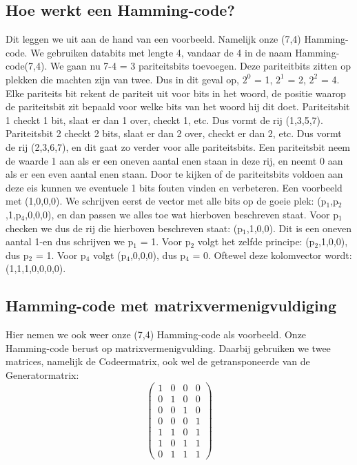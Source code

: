 \documentclass[a4paper]{article}
\begin{document}
\subsection{Hoe werkt een Hamming-code?}
Dit leggen we uit aan de hand van een voorbeeld. Namelijk onze (7,4) Hamming-code.
We gebruiken databits met lengte 4, vandaar de 4 in de naam Hamming-code(7,4). We gaan nu 7-4 = 3 pariteitsbits toevoegen. Deze pariteitbits zitten op plekken die machten zijn van twee. Dus in dit geval op, $2^0$ = 1, $2^1$ = 2, $2^2$ = 4. Elke pariteits bit rekent de pariteit uit voor bits in het woord, de positie waarop de pariteitsbit zit bepaald voor welke bits van het woord hij dit doet. Pariteitsbit 1 checkt 1 bit, slaat er dan 1 over, checkt 1, etc. Dus vormt de rij (1,3,5,7). Pariteitsbit 2 checkt 2 bits, slaat er dan 2 over, checkt er dan 2, etc. Dus vormt de rij (2,3,6,7), en dit gaat zo verder voor alle pariteitsbits. Een pariteitsbit neem de waarde 1 aan als er een oneven aantal enen staan in deze rij, en neemt 0 aan als er een even aantal enen staan. Door te kijken of de pariteitsbits voldoen aan deze eis kunnen we eventuele 1 bits fouten vinden en verbeteren. Een voorbeeld met (1,0,0,0). We schrijven eerst de vector met alle bits op de goeie plek: (p$_1$,p$_2$,1,p$_4$,0,0,0), en dan passen we alles toe wat hierboven beschreven staat. Voor p$_1$ checken we dus de rij die hierboven beschreven staat: (p$_1$,1,0,0). Dit is een oneven aantal 1-en dus schrijven we p$_1$ = 1. Voor p$_2$ volgt het zelfde principe: (p$_2$,1,0,0), dus p$_2$ = 1. Voor p$_4$ volgt (p$_4$,0,0,0), dus p$_4$ = 0. Oftewel deze kolomvector wordt: (1,1,1,0,0,0,0).

\subsection{Hamming-code met matrixvermenigvuldiging}
Hier nemen we ook weer onze (7,4) Hamming-code als voorbeeld. Onze Hamming-code berust op matrixvermenigvulding. Daarbij gebruiken we twee matrices, namelijk de Codeermatrix, ook wel de getransponeerde van de \\
Generatormatrix:
\begin{equation*}
	\begin{pmatrix}
		1&0&0&0 \\
		0&1&0&0 \\
		0&0&1&0 \\
		0&0&0&1 \\
		1&1&0&1 \\
		1&0&1&1 \\
		0&1&1&1
	\end{pmatrix}
\end{equation*}
\end{document}

